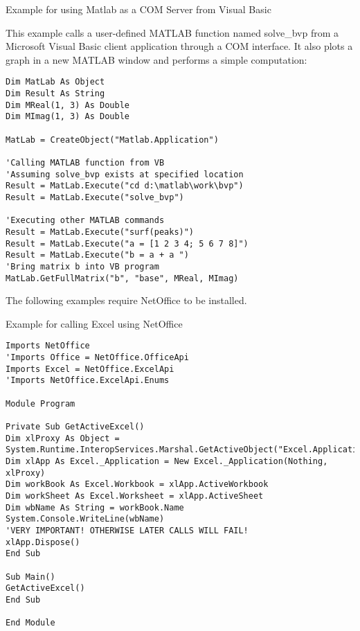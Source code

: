 \vpara
Example for using Matlab as a COM Server from Visual Basic

This example calls a user-defined MATLAB function named solve\_bvp from a Microsoft Visual Basic client application through a COM interface. It also plots a graph in a new MATLAB window and performs a simple computation:


\begin{lstlisting}
Dim MatLab As Object
Dim Result As String
Dim MReal(1, 3) As Double
Dim MImag(1, 3) As Double

MatLab = CreateObject("Matlab.Application")

'Calling MATLAB function from VB
'Assuming solve_bvp exists at specified location
Result = MatLab.Execute("cd d:\matlab\work\bvp")
Result = MatLab.Execute("solve_bvp")

'Executing other MATLAB commands
Result = MatLab.Execute("surf(peaks)")
Result = MatLab.Execute("a = [1 2 3 4; 5 6 7 8]")
Result = MatLab.Execute("b = a + a ")
'Bring matrix b into VB program
MatLab.GetFullMatrix("b", "base", MReal, MImag)
\end{lstlisting}





\newpage

\noindent The following examples require NetOffice to  be installed.

\noindent Example for calling Excel using NetOffice

\begin{lstlisting}
Imports NetOffice
'Imports Office = NetOffice.OfficeApi
Imports Excel = NetOffice.ExcelApi
'Imports NetOffice.ExcelApi.Enums

Module Program

Private Sub GetActiveExcel()
Dim xlProxy As Object = System.Runtime.InteropServices.Marshal.GetActiveObject("Excel.Application")
Dim xlApp As Excel._Application = New Excel._Application(Nothing, xlProxy)
Dim workBook As Excel.Workbook = xlApp.ActiveWorkbook
Dim workSheet As Excel.Worksheet = xlApp.ActiveSheet
Dim wbName As String = workBook.Name
System.Console.WriteLine(wbName)
'VERY IMPORTANT! OTHERWISE LATER CALLS WILL FAIL!
xlApp.Dispose()
End Sub

Sub Main()
GetActiveExcel()
End Sub

End Module
\end{lstlisting}




